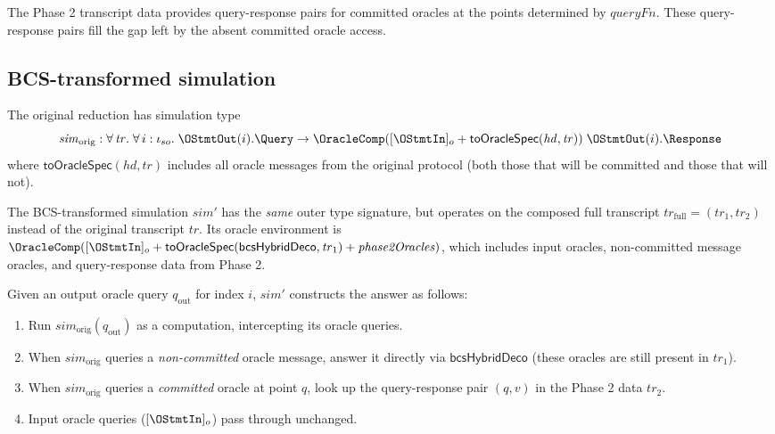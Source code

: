 The Phase 2 transcript data provides query-response pairs for committed
oracles at the points determined by $\mathit{queryFn}$.
These query-response pairs fill the gap left by the absent committed oracle
access.

\subsection{BCS-transformed simulation}

The original reduction has simulation type
\begin{equation}\label{eq:sim-type}
  \mathit{sim}_{\mathrm{orig}} :
  \forall\,\mathit{tr}.\;
  \forall\,i : \iota_{so}.\;
  \OStmtOut(i).\Query \to
  \OracleComp([\OStmtIn]_o +
    \mathsf{toOracleSpec}(\mathit{hd}, \mathit{tr})) \;
  \OStmtOut(i).\Response
\end{equation}
where $\mathsf{toOracleSpec}(\mathit{hd}, \mathit{tr})$ includes all oracle
messages from the original protocol (both those that will be committed and
those that will not).

The BCS-transformed simulation $\mathit{sim}'$ has the \emph{same} outer
type signature, but operates on the composed full transcript
$\mathit{tr}_{\mathrm{full}} = (\mathit{tr}_1, \mathit{tr}_2)$
instead of the original transcript $\mathit{tr}$.
Its oracle environment is
$\OracleComp([\OStmtIn]_o +
  \mathsf{toOracleSpec}(\mathsf{bcsHybridDeco}, \mathit{tr}_1) +
  \mathit{phase2Oracles})$,
which includes input oracles, non-committed message oracles, and
query-response data from Phase 2.

Given an output oracle query $q_{\mathrm{out}}$ for index $i$,
$\mathit{sim}'$ constructs the answer as follows:
\begin{enumerate}
  \item Run $\mathit{sim}_{\mathrm{orig}}(q_{\mathrm{out}})$ as a
    computation, intercepting its oracle queries.
  \item When $\mathit{sim}_{\mathrm{orig}}$ queries a \emph{non-committed}
    oracle message, answer it directly via $\mathsf{bcsHybridDeco}$
    (these oracles are still present in $\mathit{tr}_1$).
  \item When $\mathit{sim}_{\mathrm{orig}}$ queries a \emph{committed}
    oracle at point $q$, look up the query-response pair $(q, v)$ in the
    Phase 2 data $\mathit{tr}_2$.
  \item Input oracle queries ($[\OStmtIn]_o$) pass through unchanged.
\end{enumerate}

